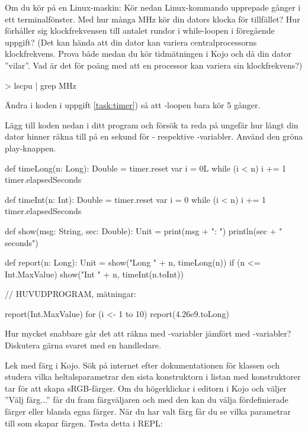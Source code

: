 \Subtask  Om du kör på en Linux-maskin: Kör nedan Linux-kommando upprepade gånger i ett terminalfönster. Med hur många MHz kör din dators klocka för tillfället? Hur förhåller sig klockfrekvensen till antalet rundor i while-loopen i föregående uppgift? (Det kan hända att din dator kan variera centralprocessorns klockfrekvens. Prova både medan du kör tidmätningen i Kojo och då din dator ''vilar''. Vad är det för poäng med att en processor kan variera sin klockfrekvens?)
\begin{REPLnonum}
> lscpu | grep MHz
\end{REPLnonum}


\Subtask Ändra i koden i uppgift \ref{task:timer}) så att -loopen bara kör 5 gånger. %

\Subtask Lägg till koden nedan i ditt program och försök ta reda på ungefär hur långt din dator hinner räkna till på en sekund för - respektive -variabler. Använd den gröna play-knappen.
\begin{CodeSmall}
def timeLong(n: Long): Double = {
  timer.reset
  var i = 0L
  while (i < n) { i += 1 }
  timer.elapsedSeconds
}

def timeInt(n: Int): Double = {
  timer.reset
  var i = 0
  while (i < n) { i += 1 }
  timer.elapsedSeconds
}

def show(msg: String, sec: Double): Unit = {
  print(msg + ": ")
  println(sec + " seconds")
}

def report(n: Long): Unit = {
  show("Long " + n, timeLong(n))
  if (n <= Int.MaxValue) show("Int  " + n, timeInt(n.toInt))
}

// HUVUDPROGRAM, mätningar:

report(Int.MaxValue)
for (i <- 1 to 10) report(4.26e9.toLong)
\end{CodeSmall}

\Subtask Hur mycket snabbare går det att räkna med -variabler jämfört med -variabler? Diskutera gärna svaret med en handledare.

\Task Lek med färg i Kojo. Sök på internet efter dokumentationen för klassen  och studera vilka heltalsparametrar den sista konstruktorn i listan med konstruktorer tar för att skapa sRGB-färger. Om du högerklickar i editorn i Kojo och väljer ''Välj färg...'' får du fram färgväljaren och med den kan du välja fördefinierade färger eller blanda egna färger. När du har valt färg får du se vilka parametrar till  som skapar färgen. Testa detta i REPL:


